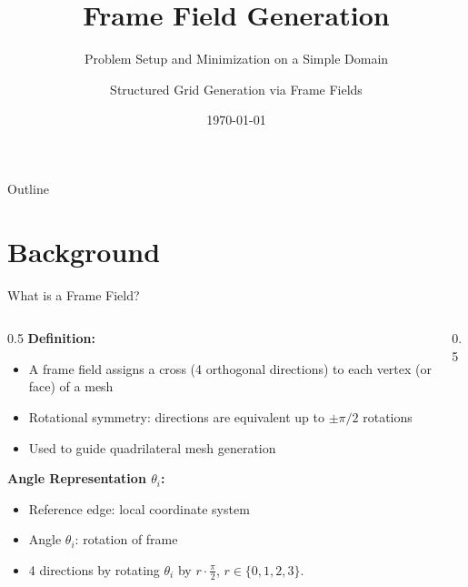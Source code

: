 \documentclass[aspectratio=169]{beamer}
\title{Frame Field Generation}
\subtitle{Problem Setup and Minimization on a Simple Domain}
\author{Structured Grid Generation via Frame Fields}
\date{\today}
\begin{document}
\begin{frame}
\titlepage
\end{frame}

\begin{frame}{Outline}
\tableofcontents
\end{frame}

\section{Background}

\begin{frame}{What is a Frame Field?}
\begin{columns}
\begin{column}{0.5\textwidth}
\textbf{Definition:}
\begin{itemize}
    \item A frame field assigns a cross (4 orthogonal directions) to each vertex (or face) of a mesh
    \item Rotational symmetry: directions are equivalent up to $\pm\pi/2$ rotations
    \item Used to guide quadrilateral mesh generation
\end{itemize}

\vspace{0.3cm}
\textbf{Angle Representation $\theta_i$:}
\begin{itemize}
    \item Reference edge: local coordinate system
    \item Angle $\theta_i$: rotation of frame
    \item 4 directions by rotating $\theta_i$ by $r \cdot \frac{\pi}{2}$, $r \in \{0,1,2,3\}.$ 
\end{itemize}
\end{column}

\begin{column}{0.5\textwidth}
\centering
{}
\end{column}
\end{columns}
\end{frame}
\end{document}
